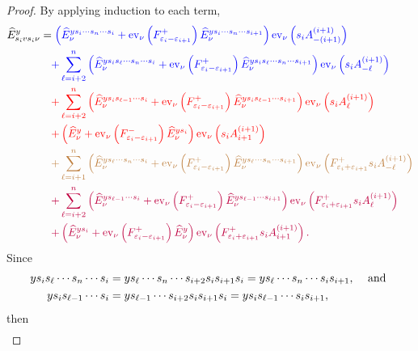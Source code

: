 \documentclass[11pt]{article}
\theoremstyle{plain}
\theoremstyle{definition}
\theoremstyle{remark}
\numberwithin{equation}{section}
\def\ev{\mathrm{ev}}
\newcounter{r}
\newcounter{s}
\begin{document}
\begin{proof}
By applying induction to each term, 
\begin{align*}
\widehat{E}^y_{s_ivs_i\nu}
&= 
{\color{blue} 
\left(\widehat{E}^{ys_i\cdots s_n\cdots s_i}_{\nu}
+\ev_\nu\left(F_{\varepsilon_i-\varepsilon_{i+1}}^+\right) 
\widehat{E}^{ys_i \cdots s_n\cdots s_{i+1}}_{\nu}\right) \ev_\nu\left(s_iA^{(i+1)}_{-(i+1)}\right)  } \\
&\quad
{\color{blue} 
+ \sum_{\ell=i+2}^n 
\left(\widehat{E}^{ys_is_\ell\cdots s_n\cdots s_i}_{\nu}
+\ev_\nu\left(F_{\varepsilon_i-\varepsilon_{i+1}}^+ \right)\widehat{E}^{ys_is_\ell\cdots s_n\cdots s_{i+1}}_{\nu}\right)
\ev_\nu\left(s_iA^{(i+1)}_{-\ell}\right)
}\\
&\quad
{\color{red} 
+\sum_{\ell=i+2}^n 
\left(\widehat{E}^{ys_is_{\ell-1}\cdots s_i}_{\nu}
+\ev_\nu\left(F_{\varepsilon_i-\varepsilon_{i+1}}^+\right) \widehat{E}^{ys_is_{\ell-1}\cdots s_{i+1}}_{\nu}\right)
\ev_\nu \left(s_iA^{(i+1)}_{\ell}\right) }
\\
&\quad
{\color{red} 
+ \left(\widehat{E}^y_{\nu}
+\ev_\nu\left(F_{\varepsilon_i-\varepsilon_{i+1}}^- \right) \widehat{E}^{ys_i}_{\nu}\right)
\ev_\nu \left(s_iA^{(i+1)}_{i+1}\right)
}\\
&\quad
{\color{brown} 
+\sum_{\ell=i+1}^n 
\left(\widehat{E}^{ys_\ell\cdots s_n\cdots s_i}_{\nu}
+\ev_\nu\left(F_{\varepsilon_i-\varepsilon_{i+1}}^+\right) \widehat{E}^{ys_\ell\cdots s_n\cdots s_{i+1}}_{\nu}\right)
\ev_\nu\left(F_{\varepsilon_i+\varepsilon_{i+1}}^+ s_i A^{(i+1)}_{-\ell}\right)
}\\
&\quad
{\color{purple} 
+\sum_{\ell=i+2}^n 
\left(\widehat{E}^{ys_{\ell-1}\cdots s_i}_{\nu}
+\ev_\nu\left(F_{\varepsilon_i-\varepsilon_{i+1}}^+\right) \widehat{E}^{ys_{\ell-1}\cdots s_{i+1}}_{\nu} \right)
\ev_\nu\left(F_{\varepsilon_i+\varepsilon_{i+1}}^+ s_iA^{(i+1)}_{\ell}\right)
 } \\
 &\quad
{\color{purple} 
+\left(\widehat{E}^{ys_i}_{\nu}
+\ev_\nu\left(F_{\varepsilon_i-\varepsilon_{i+1}}^+ \right)\widehat{E}^y_{\nu}\right)
\ev_\nu\left(F_{\varepsilon_i+\varepsilon_{i+1}}^+ s_iA^{(i+1)}_{i+1}\right).
}
\end{align*}
Since
\begin{align*}
ys_is_\ell\cdots s_n\cdots s_i &= ys_\ell\cdots s_n\cdots s_{i+2}s_i s_{i+1}s_i = ys_\ell\cdots s_n\cdots s_i s_{i+1} \text{, \quad and }\\
ys_i s_{\ell-1}\cdots s_i &= ys_{\ell-1}\cdots s_{i+2}s_i s_{i+1}s_i = ys_i s_{\ell-1}\cdots s_i s_{i+1},    
\end{align*} 
then
\begin{align*}

\end{align*}
\end{proof}
\end{document}
